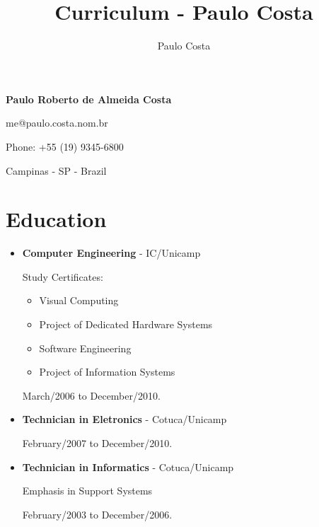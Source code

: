 \documentclass[a4paper,10pt]{article}
\title{Curriculum - Paulo Costa}
\author{Paulo Costa}
\begin{document}
  
  \LARGE\textbf{Paulo Roberto de Almeida Costa}

  \large me@paulo.costa.nom.br

  \large Phone: +55 (19) 9345-6800

  \large Campinas - SP - Brazil

  \normalsize 
  \section{Education}
    \begin{itemize}
      \item  
        \textbf{Computer Engineering} - IC/Unicamp

        Study Certificates:
        \begin{itemize}
          \item Visual Computing
          \item Project of Dedicated Hardware Systems
          \item Software Engineering
          \item Project of Information Systems
        \end{itemize}

        March/2006 to December/2010.

% 

      \item  
        \textbf{Technician in Eletronics} - Cotuca/Unicamp

        February/2007 to December/2010.

      \item  
        \textbf{Technician in Informatics} - Cotuca/Unicamp

        Emphasis in Support Systems

        February/2003 to December/2006.

    \end{itemize}
\end{document}
